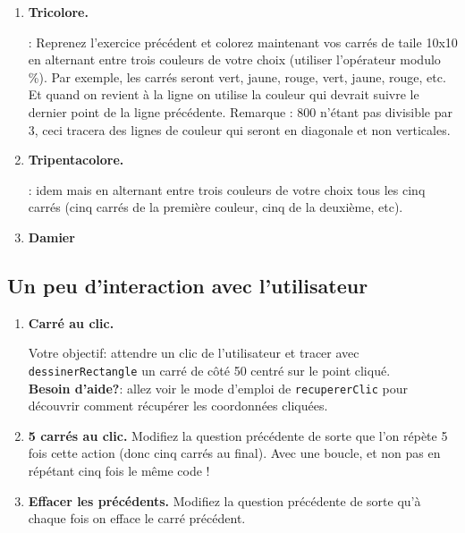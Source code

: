 \documentclass[11pt,a4paper]{article}
\newcommand{\checkbox}{$\square$ \smallskip}
\newcounter{exo} \setcounter{exo}{0}
\newenvironment{action}{%
    \begin{enumerate}[\numerotation] \addtocounter{exo}{-1}%
        }{%
    \end{enumerate}
}
\newcommand{\numexoa}{\theexo \addtocounter{exo}{1}}
\newcommand{\numerotation}{\checkbox \smallskip \numexoa.}
\newcounter{exoo} \setcounter{exoo}{0}
\newcommand{\numexo}{\theexoo}
\newcommand{\repexo}{{\tt exo_\numexo}}
\newcommand{\exoplus}{\addtocounter{exoo}{1}}
\begin{document}
\begin{action}
\item {\bf Tricolore.} \exoplus \repexo : Reprenez l'exercice précédent et colorez maintenant vos carrés de taile 10x10 en alternant entre trois couleurs de votre choix (utiliser l'opérateur modulo \%). Par exemple, les carrés seront vert, jaune, rouge, vert, jaune, rouge, etc. Et quand on revient à la ligne on utilise la couleur qui devrait suivre le dernier point de la ligne précédente. Remarque : 800 n'étant pas divisible par 3, ceci tracera des lignes de couleur qui seront en diagonale et non verticales.
\item {\bf Tripentacolore.} \exoplus \repexo : idem mais en alternant entre trois couleurs de votre choix tous les cinq carrés (cinq carrés de la première couleur, cinq de la deuxième, etc).
\item {\bf Damier}
\end{action}

\subsection*{Un peu d'interaction avec l'utilisateur}
\begin{action}
\item {\bf Carré au clic.} \exoplus \repexo Votre objectif: attendre un clic de l'utilisateur et tracer avec {\tt dessinerRectangle} un carré de côté 50 centré sur le point cliqué. \\
{\bf Besoin d'aide?}: allez voir le mode d'emploi de {\tt recupererClic} pour découvrir comment récupérer les coordonnées cliquées.
\item {\bf 5 carrés au clic.} Modifiez la question précédente de sorte que l'on répète 5 fois cette action (donc cinq carrés au final). Avec une boucle, et non pas en répétant cinq fois le même code !
\item {\bf Effacer les précédents.} Modifiez la question précédente de sorte qu'à chaque fois on efface le carré précédent.
\end{action}
\end{document}
